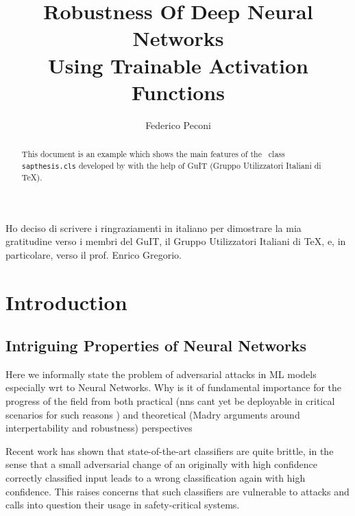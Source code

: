 \documentclass[LaM,binding=0.6cm]{./packages/sapthesis/sapthesis}
\title{Robustness Of Deep Neural Networks \\Using Trainable Activation Functions}
\author{Federico Peconi}
\begin{document}
\frontmatter

\maketitle
\dedication{Dedicated to\\ Donald Knuth}

\begin{abstract}
This document is an example which shows the main features of
the \LaTeXe\ class \texttt{sapthesis.cls} developed by 
with the help of GuIT (Gruppo Utilizzatori Italiani di \TeX).
\end{abstract}

\begin{acknowledgments}
Ho deciso di scrivere i ringraziamenti in italiano
per dimostrare la mia gratitudine verso i membri
del GuIT, il Gruppo Utilizzatori Italiani di \TeX, e, in particolare,
verso il prof. Enrico Gregorio.
\end{acknowledgments}

\tableofcontents


\mainmatter

\chapter{Introduction}

    \section{Intriguing Properties of Neural Networks}

        Here we informally state the problem of adversarial attacks in ML models 
        especially wrt to Neural Networks.
        Why is it of fundamental importance for the progress of the field from
        both practical (nns cant yet be deployable in critical scenarios for such reasons ) 
        and theoretical (Madry arguments around interpertability and robustness)
        perspectives

        Recent work has shown that state-of-the-art classifiers are quite brittle, in the sense that a small adversarial change of an originally with high confidence correctly classified input 
        leads to a wrong classification again with high confidence. 
        This raises concerns that such classifiers are vulnerable to attacks and calls into question their usage in safety-critical systems.
\end{document}
